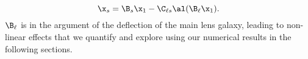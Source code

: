 \begin{equation}
\x_s = \B_s \x_1 - \C_{\ell s} \al(\B_\ell \x_1).
\end{equation}
$\B_\ell$ is in the argument of the deflection of the main lens galaxy, leading to non-linear effects that we quantify and explore using our numerical results in the following sections.
